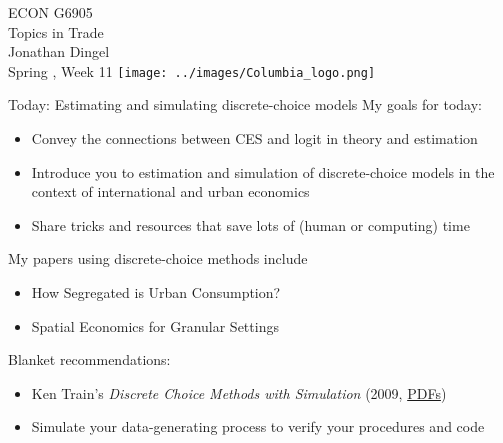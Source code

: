 \documentclass[11pt,notes=hide,aspectratio=169]{beamer}
\begin{document}
\begin{frame}[plain]
\begin{center}
\large
\textcolor{columbiadarkblue}{ECON G6905\\
Topics in Trade\\ 
Jonathan Dingel\\
Spring \the\year, Week 11}
\vfill 
\texttt{[image: ../images/Columbia\_logo.png]}
\end{center}
\end{frame}
\begin{frame}{Today: Estimating and simulating discrete-choice models}
My goals for today:
\begin{itemize}
	\item Convey the connections between CES and logit in theory and estimation
	\item Introduce you to estimation and simulation of discrete-choice models in the context of international and urban economics
	\item Share tricks and resources that save lots of (human or computing) time
\end{itemize}
My papers using discrete-choice methods include
\begin{itemize}
	\item How Segregated is Urban Consumption?
	\item Spatial Economics for Granular Settings
\end{itemize}
Blanket recommendations:
\begin{itemize}
\item Ken Train's \textit{Discrete Choice Methods with Simulation} (2009, \href{https://eml.berkeley.edu/books/choice2.html}{PDFs})
\item Simulate your data-generating process to verify your procedures and code
\end{itemize}
\end{frame}
\end{document}
